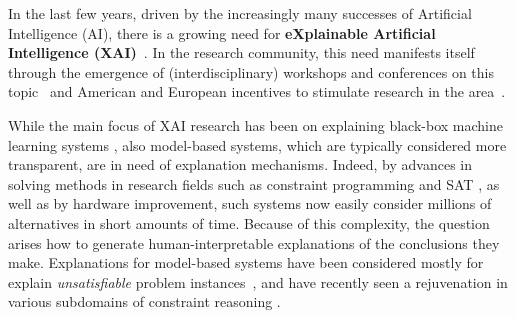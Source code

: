 
In the last few years, driven by the increasingly many successes of Artificial Intelligence (AI), there is a growing need for \textbf{eXplainable Artificial Intelligence (XAI)}~\cite{miller2019explanation}.
In the research community, this need manifests itself through the emergence of (interdisciplinary) workshops and conferences on this topic~\cite{xai-ijcai,FAT} and American and European incentives to stimulate research in the area~\cite{gunning2017explainable,hamonrobustness,fetproact}. 

While the main focus of XAI research has been on explaining black-box machine learning systems \cite{lundberg2017unified,guidotti2018survey,ignatiev2019abduction}, also model-based systems, which are typically considered more transparent, are in need of explanation mechanisms. 
Indeed, by advances in solving methods in research fields such as constraint programming \cite{fai/Rossi06} and SAT \cite{faia/2009-185}, as well as by hardware improvement, such systems now easily consider millions of alternatives in short amounts of time. 
Because of this complexity, the question arises how to generate human-interpretable explanations of the conclusions they make. 
Explanations for model-based systems have been considered mostly for explain \textit{unsatisfiable} problem instances~\cite{junker2001quickxplain}, and have recently seen a rejuvenation in various subdomains of constraint reasoning \cite{fox2017explainable,vcyras2019argumentation,chakraborti2017plan,ecai/BogaertsGCG20}.

